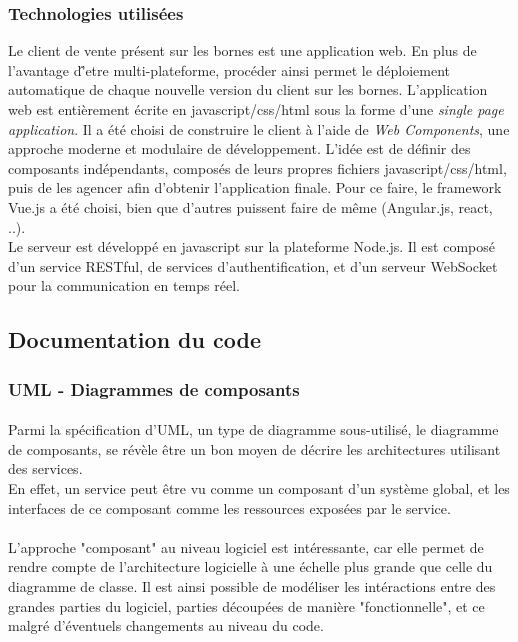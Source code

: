     \subsubsection{Technologies utilisées}
        Le client de vente présent sur les bornes est une application web. En plus de l'avantage d'̂etre
        multi-plateforme, procéder ainsi permet le déploiement automatique de chaque nouvelle version
        du client sur les bornes. L'application web est entièrement écrite en javascript/css/html
        sous la forme d'une \textit{single page application}. Il a été choisi de construire le
        client à l'aide de \textit{Web Components}, une approche moderne et modulaire de développement.
        L'idée est de définir des composants indépendants, composés de leurs propres fichiers javascript/css/html,
        puis de les agencer afin d'obtenir l'application finale. Pour ce faire, le framework Vue.js
        a été choisi, bien que d'autres puissent faire de même (Angular.js, react, ..).\\
        Le serveur est développé en javascript sur la plateforme Node.js. Il est composé d'un service
        RESTful, de services d'authentification, et d'un serveur WebSocket pour la communication en
        temps réel.


\newpage
\subsection{Documentation du code}
    \subsubsection{UML - Diagrammes de composants}
        \paragraph{}
            Parmi la spécification d'UML, un type de diagramme sous-utilisé, le diagramme de composants,
            se révèle être un bon moyen de décrire les architectures utilisant des services.\\
            En effet, un service peut être vu comme un composant d'un système global, et les interfaces
            de ce composant comme les ressources exposées par le service.

        \paragraph{}
            L'approche "composant" au niveau logiciel est intéressante, car elle permet de rendre compte
            de l'architecture logicielle à une échelle plus grande que celle du diagramme de classe.
            Il est ainsi possible de modéliser les intéractions entre des grandes parties du logiciel,
            parties découpées de manière "fonctionnelle", et ce malgré d'éventuels changements au niveau
            du code.

